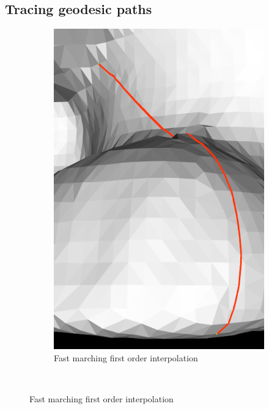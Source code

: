\documentclass{InsightArticle}
\begin{document}
\subsection{Tracing geodesic paths}
\begin{figure}
        \centering
        \begin{subfigure}[b]{0.3\textwidth}
                \centering
                \includegraphics[width=\textwidth]{GeodesicPathFastMarchingFirstOrderInterp}
                \caption{Fast marching first order interpolation}
                \label{fig:GeodesicPathFMMFirstOrder}
        \end{subfigure}%
        ~ %

\end{figure}
\end{document}

